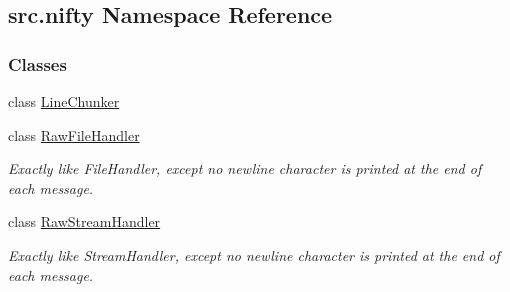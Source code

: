 \hypertarget{namespacesrc_1_1nifty}{}\subsection{src.\+nifty Namespace Reference}
\label{namespacesrc_1_1nifty}
\subsubsection*{Classes}
\begin{DoxyCompactItemize}
\item 
class \hyperlink{classsrc_1_1nifty_1_1LineChunker}{Line\+Chunker}
\item 
class \hyperlink{classsrc_1_1nifty_1_1RawFileHandler}{Raw\+File\+Handler}
\begin{DoxyCompactList}\small\item\em Exactly like File\+Handler, except no newline character is printed at the end of each message. \end{DoxyCompactList}\item 
class \hyperlink{classsrc_1_1nifty_1_1RawStreamHandler}{Raw\+Stream\+Handler}
\begin{DoxyCompactList}\small\item\em Exactly like Stream\+Handler, except no newline character is printed at the end of each message. \end{DoxyCompactList}\end{DoxyCompactItemize}
